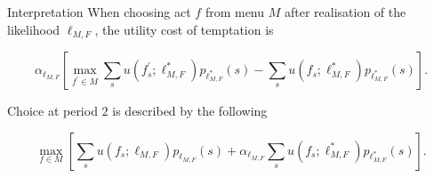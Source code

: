 \documentclass[usenames,dvipsnames,aspectratio=169,11pt, envcountsect]{beamer}
\begin{document}
\begin{frame}{Interpretation}
	When choosing act \( f \) from menu \( M \) after realisation of the likelihood \( \ell_{M, F} \), the utility cost of temptation is

	\vfill

	\[
		\alpha _{\ell_{M, F}} \left[ \max _{f^{\prime} \in M} \sum_{s} u\left(f^{\prime}_{s} ; \ell^{*}_{M, F} \right) p_{\ell^{*}_{M, F}} \left( s \right) - \sum_{s} u \left( f_{s} ; \ell^{*}_{M, F} \right) p_{\ell^{*}_{M, F}} \left( s \right) \right] .
	\] \pause

	\vfill


	Choice at period \( 2 \) is described by the following

	\vfill


	\[
		\max _{f \in M} \left[ \sum_{s} u \left( f_{s} ; \ell_{M, F} \right) p_{\ell_{M, F}} \left( s \right) +\alpha _{\ell_{M, F}} \sum_{s} u \left( f_{s} ; \ell^{*}_{M, F} \right) p_{\ell^{*}_{M, F}} \left( s \right) \right].
	\]

\end{frame}
\end{document}
